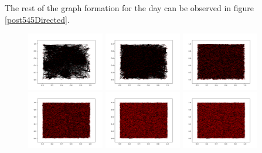 \documentclass{article}
\begin{document}
The rest of the graph formation for the day can be observed in figure \ref{post545Directed}.

\begin{figure}[h!]
    \centering
    \includegraphics[width=0.3\textwidth]{DirectedImgurGraph5.png}
    \includegraphics[width=0.3\textwidth]{DirectedImgurGraph10.png}
    \includegraphics[width=0.3\textwidth]{DirectedImgurGraph15.png}
    \includegraphics[width=0.3\textwidth]{DirectedImgurGraph20.png}
    \includegraphics[width=0.3\textwidth]{DirectedImgurGraph25.png}
    \includegraphics[width=0.3\textwidth]{DirectedImgurGraph30.png}

\end{figure}
\end{document}
